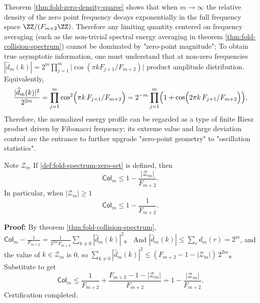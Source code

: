 \begin{remark}\label{rem:fold-zero-sparse-necessity}
Theorem \ref{thm:fold-zero-density-sparse} shows that when \(m\to\infty\) the relative density of the zero point frequency decays exponentially in the full frequency space \(\ZZ/(F_{m+2}\ZZ)\).
Therefore any limiting quantity centered on frequency averaging (such as the non-trivial spectral energy averaging in theorem \ref{thm:fold-collision-spectrum}) cannot be dominated by "zero-point magnitude";
To obtain true asymptotic information, one must understand that at non-zero frequencies
\(
|\widehat d_m(k)|=2^m\prod_{j=1}^m\bigl|\cos(\pi kF_{j+1}/F_{m+2})\bigr|
\)
product amplitude distribution. Equivalently,
\[
\frac{|\widehat d_m(k)|^2}{2^{2m}}
=\prod_{j=1}^m\cos^2\Bigl(\pi k\,F_{j+1}/F_{m+2}\Bigr)
=2^{-m}\prod_{j=1}^m\Bigl(1+\cos\Bigl(2\pi k\,F_{j+1}/F_{m+2}\Bigr)\Bigr),
\]
Therefore, the normalized energy profile can be regarded as a type of finite Riesz product driven by Fibonacci frequency; its extreme value and large deviation control are the entrance to further upgrade "zero-point geometry" to "oscillation statistics".
\end{remark}

\begin{theorem}
\label{thm:fold-collision-zero-reduction}
Note $\mathcal{Z}_m$ If \ref{def:fold-spectrum-zero-set} is defined, then
\[
\mathsf{Col}_m\le 1-\frac{|\mathcal{Z}_m|}{F_{m+2}}.
\]
In particular, when $|\mathcal{Z}_m|\ge 1$
\[
\mathsf{Col}_m\le 1-\frac{1}{F_{m+2}}.
\]
\end{theorem}

\textbf{Proof:}
By theorem \ref{thm:fold-collision-spectrum},
\(
\mathsf{Col}_m-\frac{1}{F_{m+2}}=\frac{1}{2^{2m}F_{m+2}}\sum_{k\ne 0}|\widehat d_m(k)|^2
\)。
And $|\widehat d_m(k)|\le\sum_r d_m(r)=2^m$, and the value of $k\in\mathcal{Z}_m$ is 0, so
\(
\sum_{k\ne 0}|\widehat d_m(k)|^2\le (F_{m+2}-1-|\mathcal{Z}_m|)\,2^{2m}
\)。
Substitute to get
\[
\mathsf{Col}_m
\le
\frac{1}{F_{m+2}}+\frac{F_{m+2}-1-|\mathcal{Z}_m|}{F_{m+2}}
=1-\frac{|\mathcal{Z}_m|}{F_{m+2}}.
\]
Certification completed.

